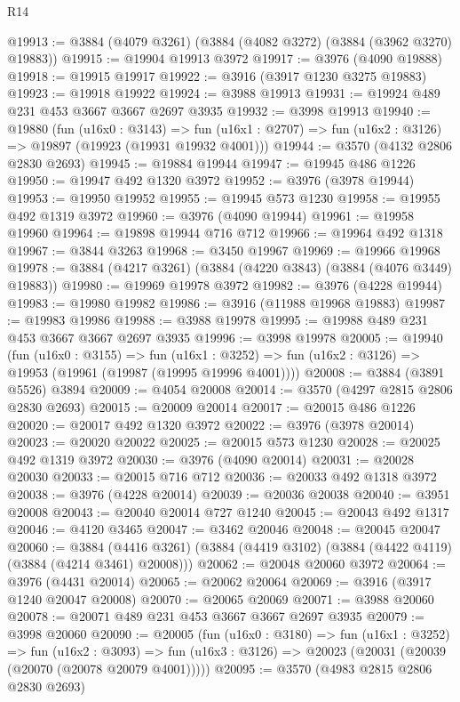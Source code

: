 \begin{lexlean}{R14}
\begin{coremodule}
@19913 := @3884 (@4079 @3261) (@3884 (@4082 @3272) (@3884 (@3962 @3270) @19883))
@19915 := @19904 @19913 @3972
@19917 := @3976 (@4090 @19888)
@19918 := @19915 @19917
@19922 := @3916 (@3917 @1230 @3275 @19883)
@19923 := @19918 @19922
@19924 := @3988 @19913
@19931 := @19924 @489 @231 @453 @3667 @3667 @2697 @3935
@19932 := @3998 @19913
@19940 := @19880
    (fun (u16x0 : @3143) =>
    fun (u16x1 : @2707) => fun (u16x2 : @3126) => @19897 (@19923 (@19931 @19932 @4001)))
@19944 := @3570 (@4132 @2806 @2830 @2693)
@19945 := @19884 @19944
@19947 := @19945 @486 @1226
@19950 := @19947 @492 @1320 @3972
@19952 := @3976 (@3978 @19944)
@19953 := @19950 @19952
@19955 := @19945 @573 @1230
@19958 := @19955 @492 @1319 @3972
@19960 := @3976 (@4090 @19944)
@19961 := @19958 @19960
@19964 := @19898 @19944 @716 @712
@19966 := @19964 @492 @1318
@19967 := @3844 @3263
@19968 := @3450 @19967
@19969 := @19966 @19968
@19978 := @3884 (@4217 @3261) (@3884 (@4220 @3843) (@3884 (@4076 @3449) @19883))
@19980 := @19969 @19978 @3972
@19982 := @3976 (@4228 @19944)
@19983 := @19980 @19982
@19986 := @3916 (@11988 @19968 @19883)
@19987 := @19983 @19986
@19988 := @3988 @19978
@19995 := @19988 @489 @231 @453 @3667 @3667 @2697 @3935
@19996 := @3998 @19978
@20005 := @19940
    (fun (u16x0 : @3155) =>
    fun (u16x1 : @3252) => fun (u16x2 : @3126) => @19953 (@19961 (@19987 (@19995 @19996 @4001))))
@20008 := @3884 (@3891 @5526) @3894
@20009 := @4054 @20008
@20014 := @3570 (@4297 @2815 @2806 @2830 @2693)
@20015 := @20009 @20014
@20017 := @20015 @486 @1226
@20020 := @20017 @492 @1320 @3972
@20022 := @3976 (@3978 @20014)
@20023 := @20020 @20022
@20025 := @20015 @573 @1230
@20028 := @20025 @492 @1319 @3972
@20030 := @3976 (@4090 @20014)
@20031 := @20028 @20030
@20033 := @20015 @716 @712
@20036 := @20033 @492 @1318 @3972
@20038 := @3976 (@4228 @20014)
@20039 := @20036 @20038
@20040 := @3951 @20008
@20043 := @20040 @20014 @727 @1240
@20045 := @20043 @492 @1317
@20046 := @4120 @3465
@20047 := @3462 @20046
@20048 := @20045 @20047
@20060 := @3884
    (@4416 @3261)
    (@3884 (@4419 @3102) (@3884 (@4422 @4119) (@3884 (@4214 @3461) @20008)))
@20062 := @20048 @20060 @3972
@20064 := @3976 (@4431 @20014)
@20065 := @20062 @20064
@20069 := @3916 (@3917 @1240 @20047 @20008)
@20070 := @20065 @20069
@20071 := @3988 @20060
@20078 := @20071 @489 @231 @453 @3667 @3667 @2697 @3935
@20079 := @3998 @20060
@20090 := @20005
    (fun (u16x0 : @3180) =>
    fun (u16x1 : @3252) =>
    fun (u16x2 : @3093) =>
    fun (u16x3 : @3126) => @20023 (@20031 (@20039 (@20070 (@20078 @20079 @4001)))))
@20095 := @3570 (@4983 @2815 @2806 @2830 @2693)

\end{coremodule}
\end{lexlean}
